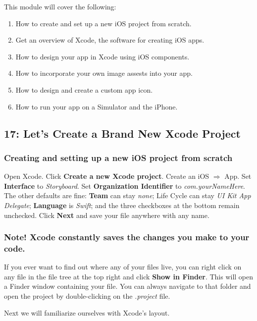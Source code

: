 \documentclass[11pt, letterpaper]{article}
\begin{document}
This module will cover the following:
\begin{enumerate}
    \itemsep0em
    \item{How to create and set up a new iOS project from scratch.}
    \item{Get an overview of Xcode, the software for creating iOS apps.}
    \item{How to design your app in Xcode using iOS components.}
    \item{How to incorporate your own image assests into your app.}
    \item{How to design and create a custom app icon.}
    \item{How to run your app on a Simulator and the iPhone.}
\end{enumerate}

\subsection*{17: Let's Create a Brand New Xcode Project}

\subsubsection*{Creating and setting up a new iOS project from scratch}

Open Xcode. Click \textbf{Create a new Xcode project}. Create an iOS $\Rightarrow$ App. 
Set \textbf{Interface} to \emph{Storyboard}. Set \textbf{Organization Identifier} to 
\emph{com.yourNameHere}. The other defaults are fine: \textbf{Team} can stay \emph{none}; Life Cycle can stay
\emph{UI Kit App Delegate}; \textbf{Language} is \emph{Swift}; and the three checkboxes at the
bottom remain unchecked. Click \textbf{Next} and save your file anywhere with any name. \\

\subsubsection*{Note! Xcode constantly saves the changes you make to your code.}

If you ever want to find out where any of your files live, you can right click on any file in the 
file tree at the top right and click \textbf{Show in Finder}. This will open a Finder window 
containing your file. You can always navigate to that folder and open the project by double-clicking
on the \emph{.project} file.

Next we will familiarize ourselves with Xcode's layout.
\end{document}
